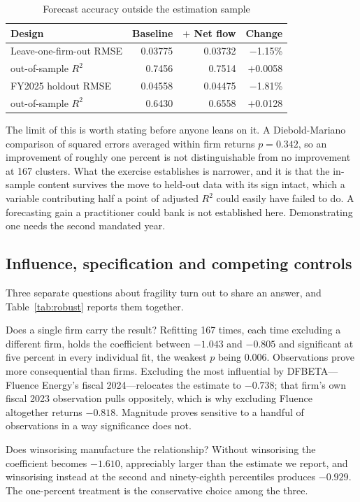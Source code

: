 \documentclass[conference,a4paper]{IEEEtran}
\begin{document}
\begin{table}[htbp]
\caption{Forecast accuracy outside the estimation sample}
\label{tab:oos}
\centering
\begin{tabular}{lrrr}
\hline
\textbf{Design} & \textbf{Baseline} & \textbf{$+$ Net flow} & \textbf{Change}\\
\hline
Leave-one-firm-out RMSE & 0.03775 & 0.03732 & $-$1.15\%\\
\quad out-of-sample $R^2$ & 0.7456 & 0.7514 & $+$0.0058\\
FY2025 holdout RMSE & 0.04558 & 0.04475 & $-$1.81\%\\
\quad out-of-sample $R^2$ & 0.6430 & 0.6558 & $+$0.0128\\
\hline
\end{tabular}
\end{table}

The limit of this is worth stating before anyone leans on it. A
Diebold-Mariano comparison of squared errors averaged within firm returns
$p = 0.342$, so an improvement of roughly one percent is not distinguishable
from no improvement at 167 clusters. What the exercise establishes is narrower,
and it is that the in-sample content survives the move to held-out data with its
sign intact, which a variable contributing half a point of adjusted $R^2$ could
easily have failed to do. A forecasting gain a practitioner could bank is not
established here. Demonstrating one needs the second mandated year.

\subsection{Influence, specification and competing controls}

Three separate questions about fragility turn out to share an answer, and
Table~\ref{tab:robust} reports them together.

Does a single firm carry the result? Refitting 167 times, each time excluding a
different firm, holds the coefficient between $-1.043$ and $-0.805$ and
significant at five percent in every individual fit, the weakest $p$ being
0.006. Observations prove more consequential than firms. Excluding the most
influential by DFBETA---Fluence Energy's fiscal 2024---relocates the estimate to
$-0.738$; that firm's own fiscal 2023 observation pulls oppositely, which is why
excluding Fluence altogether returns $-0.818$. Magnitude proves sensitive to a
handful of observations in a way significance does not.

Does winsorising manufacture the relationship? Without winsorising the
coefficient becomes $-1.610$, appreciably larger than the estimate we report,
and winsorising instead at the second and ninety-eighth percentiles produces
$-0.929$. The one-percent treatment is the conservative choice among the three.
\end{document}
